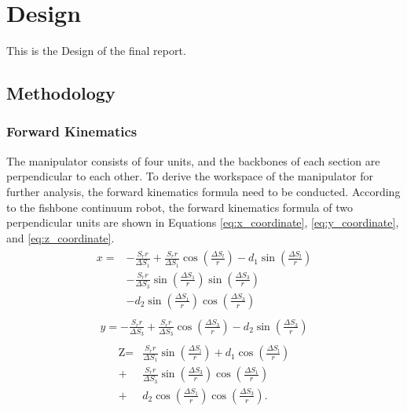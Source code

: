 \section{Design} 
This is the Design of the final report.
\subsection{Methodology}
\subsubsection{Forward Kinematics}
The manipulator consists of four units, and the backbones of each section are perpendicular to each other. To derive the 
workspace of the manipulator for further analysis, the forward kinematics formula need to be conducted. According to the 
fishbone continuum robot\cite{fishboneCR}, the forward kinematics formula of two perpendicular units are shown in 
Equations \ref{eq:x_coordinate}, \ref{eq:y_coordinate}, and \ref{eq:z_coordinate}.
\begin{align}
    \begin{aligned}
    x=&-\frac{S_{r}r}{\Delta S_{1}}+\frac{S_{r}r}{\Delta S_{1}}\cos\left(\frac{\Delta S_{l}}{r}\right)-d_{1}\sin\left(\frac{\Delta S_{l}}{r}\right) \\
    &-\frac{S_{r}r}{\Delta S_{3}}\sin\left(\frac{\Delta S_{1}}{r}\right)\sin\left(\frac{\Delta S_{3}}{r}\right) \\
    &-d_{2}\sin\left(\frac{\Delta S_{1}}{r}\right)\cos\left(\frac{\Delta S_{3}}{r}\right) 
    \end{aligned}
    \label{eq:x_coordinate}
\end{align}
\begin{align}
    \begin{aligned}
        y=-\frac{S_rr}{\Delta S_3}+\frac{S_rr}{\Delta S_3}\cos\left(\frac{\Delta S_3}{r}\right)-d_2\sin\left(\frac{\Delta S_3}{r}\right)
    \end{aligned}
    \label{eq:y_coordinate}
\end{align}
\begin{align}
    \begin{aligned}
        \text{Z} =&\frac{S_{r}r}{\Delta S_{1}}\sin\left(\frac{\Delta S_{\mathrm{l}}}{r}\right)+d_{1}\cos\left(\frac{\Delta S_{\mathrm{l}}}{r}\right) \\
        +&\frac{S_{r}r}{\Delta S_{3}}\sin\left(\frac{\Delta S_{3}}{r}\right)\cos\left(\frac{\Delta S_{1}}{r}\right) \\
        +&d_{2}\cos\left(\frac{\Delta S_{1}}{r}\right)\cos\left(\frac{\Delta S_{3}}{r}\right). 
    \end{aligned}
    \label{eq:z_coordinate}
\end{align}
